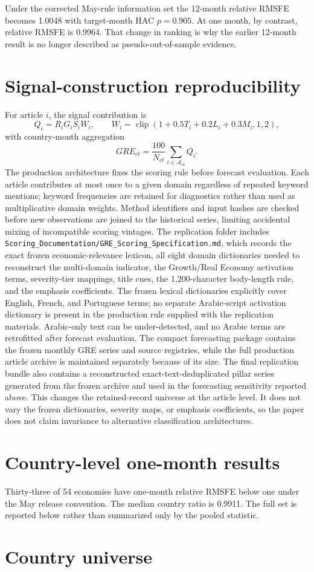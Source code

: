 \documentclass[12pt]{article}
\begin{document}
Under the corrected May-rule information set the 12-month relative RMSFE becomes 1.0048 with target-month HAC $p=0.905$. At one month, by contrast, relative RMSFE is 0.9964. That change in ranking is why the earlier 12-month result is no longer described as pseudo-out-of-sample evidence.

\section{Signal-construction reproducibility}
For article $i$, the signal contribution is
\[
Q_i=R_iG_iS_iW_i,
\qquad
W_i=\operatorname{clip}(1+0.5T_i+0.2L_i+0.3M_i,1,2),
\]
with country-month aggregation
\[
GRE_{ct}=\frac{100}{N_{ct}}\sum_{i\in\mathcal A_{ct}}Q_i.
\]
The production architecture fixes the scoring rule before forecast evaluation. Each article contributes at most once to a given domain regardless of repeated keyword mentions; keyword frequencies are retained for diagnostics rather than used as multiplicative domain weights. Method identifiers and input hashes are checked before new observations are joined to the historical series, limiting accidental mixing of incompatible scoring vintages. The replication folder includes \texttt{Scoring\_Documentation/GRE\_Scoring\_Specification.md}, which records the exact frozen economic-relevance lexicon, all eight domain dictionaries needed to reconstruct the multi-domain indicator, the Growth/Real Economy activation terms, severity-tier mappings, title cues, the 1,200-character body-length rule, and the emphasis coefficients. The frozen lexical dictionaries explicitly cover English, French, and Portuguese terms; no separate Arabic-script activation dictionary is present in the production rule supplied with the replication materials. Arabic-only text can be under-detected, and no Arabic terms are retrofitted after forecast evaluation. The compact forecasting package contains the frozen monthly GRE series and source registries, while the full production article archive is maintained separately because of its size. The final replication bundle also contains a reconstructed exact-text-deduplicated pillar series generated from the frozen archive and used in the forecasting sensitivity reported above. This changes the retained-record universe at the article level. It does not vary the frozen dictionaries, severity maps, or emphasis coefficients, so the paper does not claim invariance to alternative classification architectures.


\section{Country-level one-month results}
Thirty-three of 54 economies have one-month relative RMSFE below one under the May release convention. The median country ratio is 0.9911. The full set is reported below rather than summarized only by the pooled statistic.


\section{Country universe}

\end{document}
